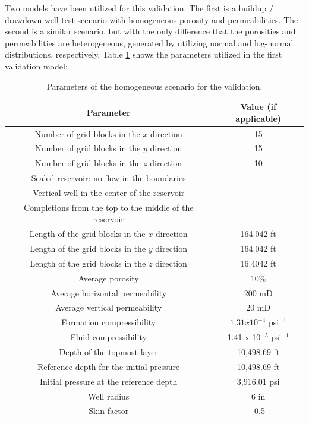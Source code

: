 Two models have been utilized for this validation. The first is a buildup / drawdown well test scenario with homogeneous porosity and permeabilities. The second is a similar scenario, but with the only difference that the porosities and permeabilities are heterogeneous, generated by utilizing normal and log-normal distributions, respectively. Table \ref{tbl:2} shows the parameters utilized in the first validation model:

\begin{table}[htbp]
	\centering
	\caption{Parameters of the homogeneous scenario for the validation.}
	\label{tbl:2}
	\begin{tabular}{c c}
		\toprule
		Parameter & Value (if applicable)\\
		\midrule
		Number of grid blocks in the $x$ direction & 15\\
		Number of grid blocks in the $y$ direction & 15\\
		Number of grid blocks in the $z$ direction & 10\\
		Sealed reservoir: no flow in the boundaries\\
		Vertical well in the center of the reservoir\\
		Completions from the top to the middle of the reservoir\\
		Length of the grid blocks in the $x$ direction & 164.042 ft\\
		Length of the grid blocks in the $y$ direction & 164.042 ft\\
		Length of the grid blocks in the $z$ direction & 16.4042 ft\\
		Average porosity & 10\%\\
		Average horizontal permeability & 200 mD\\
		Average vertical permeability & 20 mD\\
		Formation compressibility & $1.31 x 10^{-4}$ psi$^{-1}$\\
		Fluid compressibility &  1.41 x 10$^{-5}$ psi$^{-1}$\\
		Depth of the topmost layer & 10,498.69 ft\\
		Reference depth for the initial pressure & 10,498.69 ft\\
		Initial pressure at the reference depth & 3,916.01 psi\\
		Well radius & 6 in\\
		Skin factor & -0.5\\
		\bottomrule
	\end{tabular}
\end{table}

